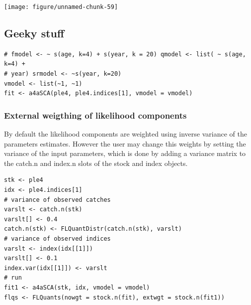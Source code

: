 \documentclass[a4paper,english,10pt]{article}\usepackage[]{graphicx}\usepackage[]{color}
\makeatletter
\newenvironment{kframe}{%
 \def\at@end@of@kframe{}%
 \ifinner\ifhmode%
  \def\at@end@of@kframe{\end{minipage}}%
  \begin{minipage}{\columnwidth}%
 \fi\fi%
 \def\FrameCommand##1{\hskip\@totalleftmargin \hskip-\fboxsep
 \colorbox{shadecolor}{##1}\hskip-\fboxsep
     \hskip-\linewidth \hskip-\@totalleftmargin \hskip\columnwidth}%
 \MakeFramed {\advance\hsize-\width
   \@totalleftmargin\z@ \linewidth\hsize
   \@setminipage}}%
 {\par\unskip\endMakeFramed%
 \at@end@of@kframe}
\newenvironment{knitrout}{}{} %
\makeatother
\begin{document}
\begin{knitrout}
\color{fgcolor}

{\centering \texttt{[image: figure/unnamed-chunk-59]} 

}



\end{knitrout}


\subsection{Geeky stuff}

\begin{knitrout}
\color{fgcolor}\begin{kframe}
\begin{verbatim}
# fmodel <- ~ s(age, k=4) + s(year, k = 20) qmodel <- list( ~ s(age, k=4) +
# year) srmodel <- ~s(year, k=20)
vmodel <- list(~1, ~1)
fit <- a4aSCA(ple4, ple4.indices[1], vmodel = vmodel)
\end{verbatim}
\end{kframe}
\end{knitrout}



\subsubsection{External weigthing of likelihood components}

By default the likelihood components are weighted using inverse variance of the parameters estimates. However the user may change this weights by setting the variance of the input parameters, which is done by adding a variance matrix to the catch.n and index.n slots of the stock and index objects. 

\begin{knitrout}
\color{fgcolor}\begin{kframe}
\begin{verbatim}
stk <- ple4
idx <- ple4.indices[1]
# variance of observed catches
varslt <- catch.n(stk)
varslt[] <- 0.4
catch.n(stk) <- FLQuantDistr(catch.n(stk), varslt)
# variance of observed indices
varslt <- index(idx[[1]])
varslt[] <- 0.1
index.var(idx[[1]]) <- varslt
# run
fit1 <- a4aSCA(stk, idx, vmodel = vmodel)
flqs <- FLQuants(nowgt = stock.n(fit), extwgt = stock.n(fit1))
\end{verbatim}
\end{kframe}
\end{knitrout}
\end{document}
